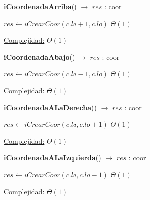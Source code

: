 \begin{Algoritmos}
\begin{algorithm}[H]{\textbf{iCoordenadaArriba}() $\to$ $res$ : coor}
    	\begin{algorithmic}[1]
			\State $res \gets iCrearCoor(c.la + 1, c.lo)$ \Comment $\Theta(1)$
			
			\medskip
			\Statex \underline{Complejidad:} $\Theta(1)$
    	\end{algorithmic}
\end{algorithm}

\begin{algorithm}[H]{\textbf{iCoordenadaAbajo}() $\to$ $res$ : coor}
    	\begin{algorithmic}[1]
			\State $res \gets iCrearCoor(c.la - 1, c.lo)$ \Comment $\Theta(1)$
			
			\medskip
			\Statex \underline{Complejidad:} $\Theta(1)$
    	\end{algorithmic}
\end{algorithm}

\begin{algorithm}[H]{\textbf{iCoordenadaALaDerecha}() $\to$ $res$ : coor}
    	\begin{algorithmic}[1]
			\State $res \gets iCrearCoor(c.la, c.lo + 1)$ \Comment $\Theta(1)$
			
			\medskip
			\Statex \underline{Complejidad:} $\Theta(1)$
    	\end{algorithmic}
\end{algorithm}

\begin{algorithm}[H]{\textbf{iCoordenadaALaIzquierda}() $\to$ $res$ : coor}
    	\begin{algorithmic}[1]
			\State $res \gets iCrearCoor(c.la, c.lo - 1)$ \Comment $\Theta(1)$
			
			\medskip
			\Statex \underline{Complejidad:} $\Theta(1)$
    	\end{algorithmic}
\end{algorithm}

\end{Algoritmos}